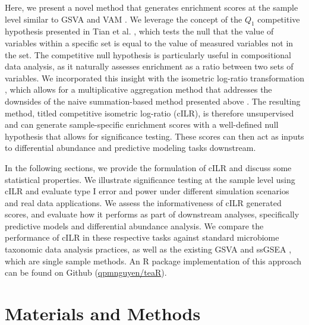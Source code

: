 \documentclass[10pt,letterpaper]{article}
\begin{document}
Here, we present a novel method that generates enrichment scores at the sample level similar to GSVA \cite{hanzelmann2013} and VAM \cite{frost2020a}. We leverage the concept of the $Q_1$ competitive hypothesis presented in Tian et al. \cite{tian2005}, which tests the null that the value of variables within a specific set is equal to the value of measured variables not in the set. The competitive null hypothesis is particularly useful in compositional data analysis, as it naturally assesses enrichment as a ratio between two sets of variables. We incorporated this insight with the isometric log-ratio transformation \cite{egozcue2003}, which allows for a multiplicative aggregation method that addresses the downsides of the naive summation-based method presented above \cite{mclaren2019, silverman2017}. The resulting method, titled competitive isometric log-ratio (cILR), is therefore unsupervised and can generate sample-specific enrichment scores with a well-defined null hypothesis that allows for significance testing. These scores can then act as inputs to differential abundance and predictive modeling tasks downstream. 

In the following sections, we provide the formulation of cILR and discuss some statistical properties. We illustrate significance testing at the sample level using cILR and evaluate type I error and power under different simulation scenarios and real data applications. We assess the informativeness of cILR generated scores, and evaluate how it performs as part of downstream analyses, specifically predictive models and differential abundance analysis. We compare the performance of cILR in these respective tasks against standard microbiome taxonomic data analysis practices, as well as the existing GSVA \cite{hanzelmann2013} and ssGSEA \cite{barbie2009}, which are single sample methods. An R package implementation of this approach can be found on Github (\href{www.github.com/qpmnguyen/teaR}{qpmnguyen/teaR}).

\section*{Materials and Methods} \label{methods}
\end{document}
